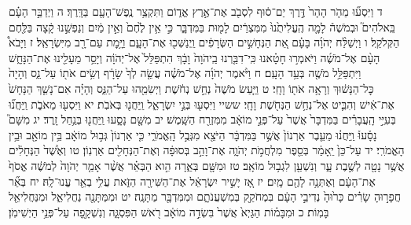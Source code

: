 \documentclass[twoside, openany, parskip=half, 11pt]{book}
\begin{document}
ד וַיִּסְע֞וּ מֵהֹ֤ר הָהָר֙ דֶּ֣רֶךְ יַם־ס֔וּף לִסְבֹ֖ב אֶת־אֶ֣רֶץ אֱד֑וֹם וַתִּקְצַ֥ר נֶֽפֶשׁ־הָעָ֖ם בַּדָּֽרֶךְ׃ ה וַיְדַבֵּ֣ר הָעָ֗ם בֵּֽאלֹהִים֮ וּבְמֹשֶׁה֒ לָמָ֤ה הֶֽעֱלִיתֻ֙נוּ֙ מִמִּצְרַ֔יִם לָמ֖וּת בַּמִּדְבָּ֑ר כִּ֣י אֵ֥ין לֶ֙חֶם֙ וְאֵ֣ין מַ֔יִם וְנַפְשֵׁ֣נוּ קָ֔צָה בַּלֶּ֖חֶם הַקְּלֹקֵֽל׃ ו וַיְשַׁלַּ֨ח יְהֹוָ֜ה בָּעָ֗ם אֵ֚ת הַנְּחָשִׁ֣ים הַשְּׂרָפִ֔ים וַֽיְנַשְּׁכ֖וּ אֶת־הָעָ֑ם וַיָּ֥מׇת עַם־רָ֖ב מִיִּשְׂרָאֵֽל׃ ז וַיָּבֹא֩ הָעָ֨ם אֶל־מֹשֶׁ֜ה וַיֹּאמְר֣וּ חָטָ֗אנוּ כִּֽי־דִבַּ֤רְנוּ בַֽיהֹוָה֙ וָבָ֔ךְ הִתְפַּלֵּל֙ אֶל־יְהֹוָ֔ה וְיָסֵ֥ר מֵעָלֵ֖ינוּ אֶת־הַנָּחָ֑שׁ וַיִּתְפַּלֵּ֥ל מֹשֶׁ֖ה בְּעַ֥ד הָעָֽם׃ ח וַיֹּ֨אמֶר יְהֹוָ֜ה אֶל־מֹשֶׁ֗ה עֲשֵׂ֤ה לְךָ֙ שָׂרָ֔ף וְשִׂ֥ים אֹת֖וֹ עַל־נֵ֑ס וְהָיָה֙ כׇּל־הַנָּשׁ֔וּךְ וְרָאָ֥ה אֹת֖וֹ וָחָֽי׃ ט וַיַּ֤עַשׂ מֹשֶׁה֙ נְחַ֣שׁ נְחֹ֔שֶׁת וַיְשִׂמֵ֖הוּ עַל־הַנֵּ֑ס וְהָיָ֗ה אִם־נָשַׁ֤ךְ הַנָּחָשׁ֙ אֶת־אִ֔ישׁ וְהִבִּ֛יט אֶל־נְחַ֥שׁ הַנְּחֹ֖שֶׁת וָחָֽי׃ ששיי וַיִּסְע֖וּ בְּנֵ֣י יִשְׂרָאֵ֑ל וַֽיַּחֲנ֖וּ בְּאֹבֹֽת׃ יא וַיִּסְע֖וּ מֵאֹבֹ֑ת וַֽיַּחֲנ֞וּ בְּעִיֵּ֣י הָֽעֲבָרִ֗ים בַּמִּדְבָּר֙ אֲשֶׁר֙ עַל־פְּנֵ֣י מוֹאָ֔ב מִמִּזְרַ֖ח הַשָּֽׁמֶשׁ׃ יב מִשָּׁ֖ם נָסָ֑עוּ וַֽיַּחֲנ֖וּ בְּנַ֥חַל זָֽרֶד׃ יג מִשָּׁם֮ נָסָ֒עוּ֒ וַֽיַּחֲנ֗וּ מֵעֵ֤בֶר אַרְנוֹן֙ אֲשֶׁ֣ר בַּמִּדְבָּ֔ר הַיֹּצֵ֖א מִגְּבֻ֣ל הָֽאֱמֹרִ֑י כִּ֤י אַרְנוֹן֙ גְּב֣וּל מוֹאָ֔ב בֵּ֥ין מוֹאָ֖ב וּבֵ֥ין הָאֱמֹרִֽי׃ יד עַל־כֵּן֙ יֵֽאָמַ֔ר בְּסֵ֖פֶר מִלְחֲמֹ֣ת יְהֹוָ֑ה אֶת־וָהֵ֣ב בְּסוּפָ֔ה וְאֶת־הַנְּחָלִ֖ים אַרְנֽוֹן׃ טו וְאֶ֙שֶׁד֙ הַנְּחָלִ֔ים אֲשֶׁ֥ר נָטָ֖ה לְשֶׁ֣בֶת עָ֑ר וְנִשְׁעַ֖ן לִגְב֥וּל מוֹאָֽב׃ טז וּמִשָּׁ֖ם בְּאֵ֑רָה הִ֣וא הַבְּאֵ֗ר אֲשֶׁ֨ר אָמַ֤ר יְהֹוָה֙ לְמֹשֶׁ֔ה אֱסֹף֙ אֶת־הָעָ֔ם וְאֶתְּנָ֥ה לָהֶ֖ם מָֽיִם׃
יז אָ֚ז יָשִׁ֣יר יִשְׂרָאֵ֔ל אֶת־הַשִּׁירָ֖ה הַזֹּ֑את עֲלִ֥י בְאֵ֖ר עֱנוּ־לָֽהּ׃ יח בְּאֵ֞ר חֲפָר֣וּהָ שָׂרִ֗ים כָּר֙וּהָ֙ נְדִיבֵ֣י הָעָ֔ם בִּמְחֹקֵ֖ק בְּמִשְׁעֲנֹתָ֑ם וּמִמִּדְבָּ֖ר מַתָּנָֽה׃ יט וּמִמַּתָּנָ֖ה נַחֲלִיאֵ֑ל וּמִנַּחֲלִיאֵ֖ל בָּמֽוֹת׃ כ וּמִבָּמ֗וֹת הַגַּיְא֙ אֲשֶׁר֙ בִּשְׂדֵ֣ה מוֹאָ֔ב רֹ֖אשׁ הַפִּסְגָּ֑ה וְנִשְׁקָ֖פָה עַל־פְּנֵ֥י הַיְשִׁימֹֽן׃
\end{document}
